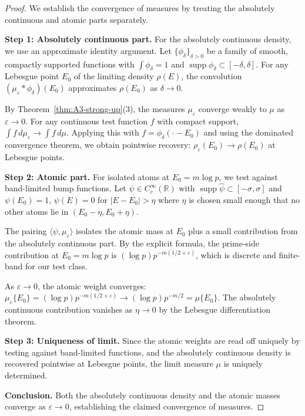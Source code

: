 ﻿\documentclass[12pt,a4paper]{article}
\theoremstyle{definition}
\theoremstyle{remark}
\newcommand{\RR}{\mathbb{R}}
\newcommand{\supp}{\operatorname{supp}}
\begin{document}
\begin{proof}
We establish the convergence of measures by treating the absolutely continuous and atomic parts separately.

\textbf{Step 1: Absolutely continuous part.} For the absolutely continuous density, we use an approximate identity argument. Let $\{\phi_\delta\}_{\delta>0}$ be a family of smooth, compactly supported functions with $\int \phi_\delta = 1$ and $\supp \phi_\delta \subset [-\delta,\delta]$. For any Lebesgue point $E_0$ of the limiting density $\rho(E)$, the convolution $(\mu_\varepsilon * \phi_\delta)(E_0)$ approximates $\rho(E_0)$ as $\delta \to 0$.

By Theorem~\ref{thm:A3-strong-up}(3), the measures $\mu_\varepsilon$ converge weakly to $\mu$ as $\varepsilon \to 0$. For any continuous test function $f$ with compact support, $\int f \, d\mu_\varepsilon \to \int f \, d\mu$. Applying this with $f = \phi_\delta(\cdot - E_0)$ and using the dominated convergence theorem, we obtain pointwise recovery: $\rho_\varepsilon(E_0) \to \rho(E_0)$ at Lebesgue points.

\textbf{Step 2: Atomic part.} For isolated atoms at $E_0 = m\log p$, we test against band-limited bump functions. Let $\psi \in C_c^\infty(\RR)$ with $\supp \widehat{\psi} \subset [-\sigma,\sigma]$ and $\psi(E_0) = 1$, $\psi(E) = 0$ for $|E - E_0| > \eta$ where $\eta$ is chosen small enough that no other atoms lie in $(E_0-\eta, E_0+\eta)$.

The pairing $\langle \psi, \mu_\varepsilon \rangle$ isolates the atomic mass at $E_0$ plus a small contribution from the absolutely continuous part. By the explicit formula, the prime-side contribution at $E_0 = m\log p$ is $(\log p) p^{-m(1/2+\varepsilon)}$, which is discrete and finite-band for our test class.

As $\varepsilon \to 0$, the atomic weight converges: $\mu_\varepsilon\{E_0\} = (\log p) p^{-m(1/2+\varepsilon)} \to (\log p) p^{-m/2} = \mu\{E_0\}$. The absolutely continuous contribution vanishes as $\eta \to 0$ by the Lebesgue differentiation theorem.

\textbf{Step 3: Uniqueness of limit.} Since the atomic weights are read off uniquely by testing against band-limited functions, and the absolutely continuous density is recovered pointwise at Lebesgue points, the limit measure $\mu$ is uniquely determined.

\textbf{Conclusion.} Both the absolutely continuous density and the atomic masses converge as $\varepsilon \to 0$, establishing the claimed convergence of measures.
\end{proof}
\end{document}
